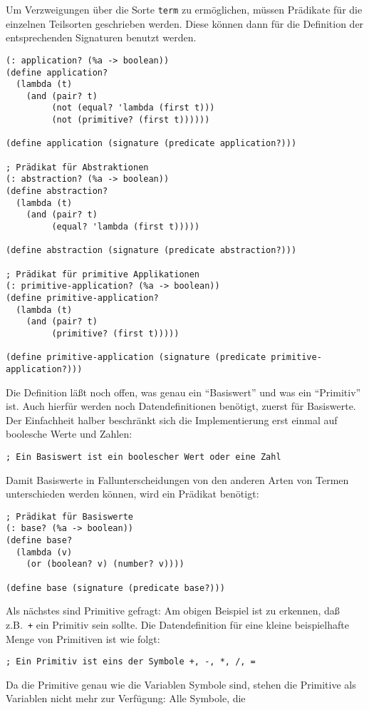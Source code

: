 Um Verzweigungen über die Sorte \texttt{term} zu ermöglichen, müssen
Prädikate für die einzelnen Teilsorten geschrieben werden.  Diese
können dann für die Definition der entsprechenden Signaturen benutzt
werden.
%
\begin{verbatim}
(: application? (%a -> boolean))
(define application?
  (lambda (t)
    (and (pair? t)
         (not (equal? 'lambda (first t)))
         (not (primitive? (first t))))))

(define application (signature (predicate application?)))

; Prädikat für Abstraktionen
(: abstraction? (%a -> boolean))
(define abstraction?
  (lambda (t)
    (and (pair? t)
         (equal? 'lambda (first t)))))

(define abstraction (signature (predicate abstraction?)))

; Prädikat für primitive Applikationen
(: primitive-application? (%a -> boolean))
(define primitive-application?
  (lambda (t)
    (and (pair? t)
         (primitive? (first t)))))

(define primitive-application (signature (predicate primitive-application?)))
\end{verbatim}
%
Die Definition läßt noch offen, was genau ein "`Basiswert"' und was ein
"`Primitiv"' ist.  Auch hierfür werden noch Datendefinitionen
benötigt, zuerst für Basiswerte.  Der Einfachheit halber beschränkt
sich die Implementierung erst einmal auf boolesche Werte und Zahlen:
%
\begin{verbatim}
; Ein Basiswert ist ein boolescher Wert oder eine Zahl
\end{verbatim}
%
Damit Basiswerte in Fallunterscheidungen von den anderen Arten von
Termen unterschieden werden können, wird ein Prädikat benötigt:
%
\begin{verbatim}
; Prädikat für Basiswerte
(: base? (%a -> boolean))
(define base?
  (lambda (v)
    (or (boolean? v) (number? v))))

(define base (signature (predicate base?)))
\end{verbatim}
%
Als nächstes sind Primitive gefragt: Am obigen Beispiel ist zu
erkennen, daß z.B.\ \texttt{+} ein Primitiv sein sollte.  Die
Datendefinition für eine kleine beispielhafte Menge von Primitiven ist
wie folgt:
%
\begin{verbatim}
; Ein Primitiv ist eins der Symbole +, -, *, /, =
\end{verbatim}
%
Da die Primitive genau wie die Variablen Symbole sind, stehen die
Primitive als Variablen nicht mehr zur Verfügung:  Alle Symbole, die
